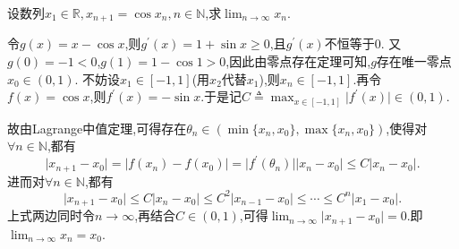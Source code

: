 \documentclass[../../main.tex]{subfiles}
\begin{document}
\begin{example}
设数列\(x_1\in\mathbb{R},x_{n + 1} = \cos x_n,n\in\mathbb{N}\),求\(\lim_{n \to \infty} x_n\).
\end{example}
\begin{solution}
令\(g(x)=x - \cos x\),则\(g^\prime(x)=1 + \sin x\geqslant0\),且\(g^\prime(x)\)不恒等于\(0\).
又\(g(0)= -1 < 0\),\(g(1)=1 - \cos 1 > 0\),因此由零点存在定理可知,\(g\)存在唯一零点\(x_0\in(0,1)\).
不妨设\(x_1\in[-1,1]\)(用\(x_2\)代替\(x_1\)),则\(x_n\in[-1,1]\).再令\(f(x)=\cos x\),则\(f^\prime(x)=-\sin x\).于是记\(C\triangleq \max_{x\in[-1,1]}\vert f^\prime(x)\vert\in(0,1)\).

故由Lagrange中值定理,可得存在\(\theta_n\in(\min\{x_n,x_0\},\max\{x_n,x_0\})\),使得对\(\forall n\in\mathbb{N}\),都有
\[
\vert x_{n + 1}-x_0\vert=\vert f(x_n)-f(x_0)\vert=\vert f^\prime(\theta_n)\vert\vert x_n - x_0\vert\leqslant C\vert x_n - x_0\vert.
\]
进而对\(\forall n\in\mathbb{N}\),都有
\[
\vert x_{n + 1}-x_0\vert\leqslant C\vert x_n - x_0\vert\leqslant C^2\vert x_{n - 1}-x_0\vert\leqslant\cdots\leqslant C^n\vert x_1 - x_0\vert.
\]
上式两边同时令\(n\rightarrow\infty\),再结合\(C\in(0,1)\),可得\(\lim_{n\rightarrow\infty}\vert x_{n + 1}-x_0\vert = 0\).即\(\lim_{n\rightarrow\infty}x_n = x_0\).

\end{solution}
\end{document}
